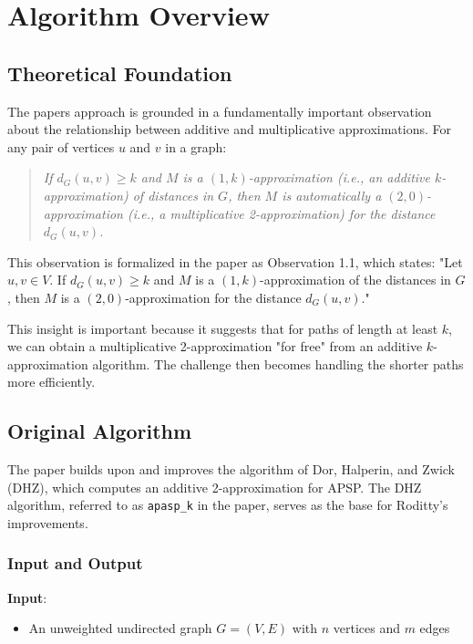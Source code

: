 \documentclass[a4paper,11pt,oneside]{book}
\begin{document}
\section{Algorithm Overview}

\subsection{Theoretical Foundation}
The papers approach is grounded in a fundamentally important observation about the relationship between additive and multiplicative approximations. For any pair of vertices $u$ and $v$ in a graph:

\begin{quote}
\textit{If $d_G(u, v) \geq k$ and $M$ is a $(1, k)$-approximation (i.e., an additive $k$-approximation) of distances in $G$, then $M$ is automatically a $(2, 0)$-approximation (i.e., a multiplicative 2-approximation) for the distance $d_G(u, v)$.}
\end{quote}

This observation is formalized in the paper as Observation 1.1, which states: "Let $u, v \in V$. If $d_G(u, v) \geq k$ and $M$ is a $(1, k)$-approximation of the distances in $G$, then $M$ is a $(2, 0)$-approximation for the distance $d_G(u, v)$."

This insight is important because it suggests that for paths of length at least $k$, we can obtain a multiplicative 2-approximation "for free" from an additive $k$-approximation algorithm. The challenge then becomes handling the shorter paths more efficiently.

\subsection{Original Algorithm}
The paper builds upon and improves the algorithm of Dor, Halperin, and Zwick (DHZ), which computes an additive 2-approximation for APSP. The DHZ algorithm, referred to as \texttt{apasp\_k} in the paper, serves as the base for Roditty's improvements.\\

\subsubsection{Input and Output}
\textbf{Input}: 
\begin{itemize}
    \item An unweighted undirected graph $G = (V, E)$ with $n$ vertices and $m$ edges
\end{itemize}
\end{document}
